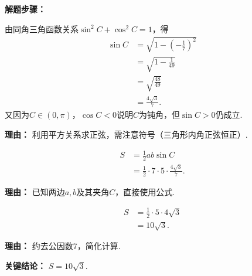 \begin{examplebox}
	\textbf{\textcolor{CExample}{解题步骤：}}
	\begin{description}[style=nextline, leftmargin=2.8em, labelsep=0.5em, itemsep=0.45em]
		\item[\textbf{第一步（求夹角正弦）：}] 由同角三角函数关系$\sin^2 C + \cos^2 C = 1$，得
			\[
				\begin{aligned}
					\sin C &= \sqrt{1 - \left(-\frac17\right)^2} \\
					&= \sqrt{1 - \frac{1}{49}} \\
					&= \sqrt{\frac{48}{49}} \\
					&= \frac{4\sqrt{3}}{7}.
			\end{aligned}
			\]
			又因为$C\in(0,\pi)$，$\cos C<0$说明$C$为钝角，但$\sin C>0$仍成立.
			\par\textbf{理由：} 利用平方关系求正弦，需注意符号（三角形内角正弦恒正）.
		\item[\textbf{第二步（代入面积公式）：}]
			\[
				\begin{aligned}
					S &= \frac12 ab\sin C \\
					&= \frac12 \cdot 7 \cdot 5 \cdot \frac{4\sqrt{3}}{7}.
			\end{aligned}
			\]
			\par\textbf{理由：} 已知两边$a,b$及其夹角$C$，直接使用公式.
		\item[\textbf{第三步（化简得结果）：}]
			\[
				\begin{aligned}
					S &= \frac12 \cdot 5 \cdot 4\sqrt{3} \\
					&= 10\sqrt{3}.
			\end{aligned}
			\]
			\par\textbf{理由：} 约去公因数7，简化计算.
	\end{description}
	\textbf{\textcolor{CExample}{关键结论：}}
	$S=10\sqrt{3}$.
\end{examplebox}
